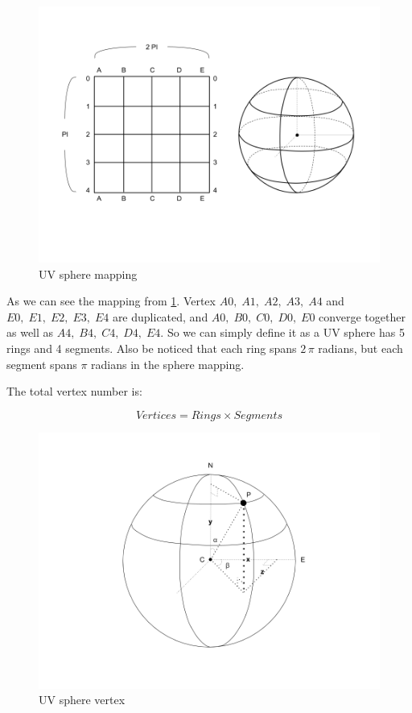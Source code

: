 \begin{figure}[H]
\caption{UV sphere mapping}
\label{fig:uv-sphere-mapping}
\centering
\includegraphics[width=\linewidth]{Figures/uv-sphere-mapping.png}
\decoRule
\end{figure}

As we can see the mapping from \ref{fig:uv-sphere-mapping}. Vertex $A0,\;A1,\;A2,\;A3,\;A4$ and $E0,\;E1,\;E2,\;E3,\;E4$ are duplicated, and $A0,\;B0,\;C0,\;D0,\;E0$ converge together as well as $A4,\;B4,\;C4,\;D4,\;E4$. So we can simply define it as a UV sphere has 5 rings and 4 segments. Also be noticed that each ring spans $2\,\pi$ radians, but each segment spans $\pi$ radians in the sphere mapping.

The total vertex number is:

\begin{equation}
\label{equ:uv-sphere-vertices}
Vertices = Rings \times Segments
\end{equation}

\begin{figure}[H]
\caption{UV sphere vertex}
\label{fig:uv-sphere-vertex}
\centering
\includegraphics[width=\linewidth]{Figures/uv-sphere-vertex.png}
\decoRule
\end{figure}

